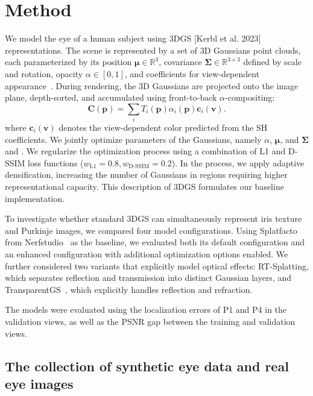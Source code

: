 \documentclass[sigconf, screen, review]{acmart}
\begin{document}
\section{Method}

We model the eye of a human subject using 3DGS [Kerbl et al. 2023] representations. The scene is represented by a set of 3D Gaussians point clouds, each parameterized by its position \(\boldsymbol{\mu}\in\mathbb{R}^{3}\), covariance \(\boldsymbol{\Sigma}\in\mathbb{R}^{3\times3}\) defined by scale and rotation, opacity \(\alpha\in[0,1]\), and \SH{} coefficients for view-dependent appearance~\cite{Gaussian_Splatting}. During rendering, the 3D Gaussians are projected onto the image plane, depth-sorted, and accumulated using front-to-back \(\alpha\)-compositing:
%
\begin{equation}
\mathbf{C}(\mathbf{p})
=
\sum_i
T_i(\mathbf{p})
\alpha_i(\mathbf{p})
\mathbf{c}_i(\mathbf{v})
\label{eq:color_rendering}.
\end{equation}
where \(\mathbf{c}_i(\mathbf{v})\) denotes the view-dependent color predicted from the SH coefficients. We jointly optimize parameters of the Gaussians, namely $\alpha$, $\boldsymbol{\mu}$, and $\boldsymbol{\Sigma}$ and \SH{}. We regularize the optimization process using a combination of L1 and D-SSIM loss functions ($w_{\mathrm{L1}}=0.8, w_{\mathrm{D\text{-}SSIM}}=0.2$). In the process, we apply adaptive densification, increasing the number of Gaussians in regions requiring higher representational capacity. This description of 3DGS formulates our baseline implementation.

To investigate whether standard 3DGS can simultaneously represent
iris texture and Purkinje images, we compared four model
configurations. Using Splatfacto from
Nerfstudio~\cite{Nerfstudio} as the baseline, we evaluated both
its default configuration and an enhanced configuration with
additional optimization options enabled. We further considered
two variants that explicitly model optical effects:
RT-Splatting, which separates reflection and transmission into
distinct Gaussian layers, and TransparentGS~\cite{TransparentGS},
which explicitly handles reflection and refraction.

The models were evaluated using the localization errors of P1
and P4 in the validation views, as well as the PSNR gap between
the training and validation views.

\subsection{The collection of synthetic eye data and real eye images}
\end{document}
